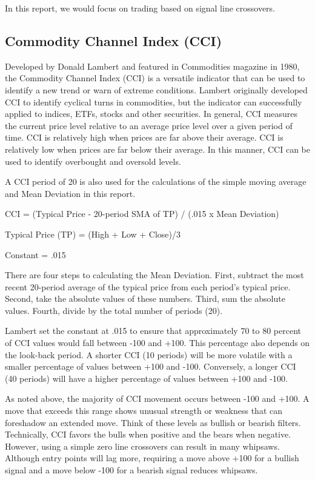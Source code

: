 In this report, we would focus on trading based on signal line crossovers.

\subsection{Commodity Channel Index (CCI)}
Developed by Donald Lambert and featured in Commodities magazine in 1980, the Commodity Channel Index (CCI) is a versatile indicator that can be used to identify a new trend or warn of extreme conditions. Lambert originally developed CCI to identify cyclical turns in commodities, but the indicator can successfully applied to indices, ETFs, stocks and other securities. In general, CCI measures the current price level relative to an average price level over a given period of time. CCI is relatively high when prices are far above their average. CCI is relatively low when prices are far below their average. In this manner, CCI can be used to identify overbought and oversold levels.

A CCI period of 20 is also used for the calculations of the simple moving average and Mean Deviation in this report.

CCI = (Typical Price  -  20-period SMA of TP) / (.015 x Mean Deviation)

Typical Price (TP) = (High + Low + Close)/3

Constant = .015

There are four steps to calculating the Mean Deviation. First, subtract 
the most recent 20-period average of the typical price from each period's 
typical price. Second, take the absolute values of these numbers. Third, 
sum the absolute values. Fourth, divide by the total number of periods (20). 

Lambert set the constant at .015 to ensure that approximately 70 to 80 percent of CCI values would fall between -100 and +100. This percentage also depends on the look-back period. A shorter CCI (10 periods) will be more volatile with a smaller percentage of values between +100 and -100. Conversely, a longer CCI (40 periods) will have a higher percentage of values between +100 and -100.

As noted above, the majority of CCI movement occurs between -100 and +100. A move that exceeds this range shows unusual strength or weakness that can foreshadow an extended move. Think of these levels as bullish or bearish filters. Technically, CCI favors the bulls when positive and the bears when negative. However, using a simple zero line crossovers can result in many whipsaws. Although entry points will lag more, requiring a move above +100 for a bullish signal and a move below -100 for a bearish signal reduces whipsaws.


